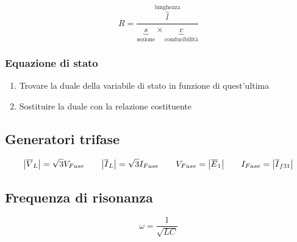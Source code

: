 \documentclass[10pt]{article}
\begin{document}
        \begin{minipage}[t]{.2\textwidth}
            \vspace{-\baselineskip}
            
            \[
                R = \frac{\overbrace{l}^{\text{lunghezza}}}{\underbrace{s}_{\text{sezione}} \times \underbrace{c}_{\text{conducibilità}}}
            \]

        \end{minipage}
        \begin{minipage}[t]{.3\textwidth}
            \vspace{-\baselineskip}
            
            \subsubsection*{Equazione di stato}
            \vspace{-.23cm}

                \begin{enumerate}
                    \item Trovare la duale della variabile di stato in funzione di quest'ultima
                    \item Sostituire la duale con la relazione costituente
                \end{enumerate}

        \end{minipage}

    \hspace{-.65cm}
    \begin{minipage}[t]{.5\textwidth}
        \subsection*{Generatori trifase}
    
            \[
                \abs{\overline{V}_L} = \sqrt{3} V_{Fase} \qquad \abs{\overline{I}_L} = \sqrt{3} I_{Fase} \qquad V_{Fase} = \abs{\overline{E}_1} \qquad I_{Fase} = \abs{\overline{I}_{f31}}
            \]
    \end{minipage}
    \hfill
    \begin{minipage}[t]{.4\textwidth}
        \subsection*{Frequenza di risonanza}

            \[
                \omega = \frac{1}{\sqrt{LC}}
            \]
    \end{minipage}
\end{document}
